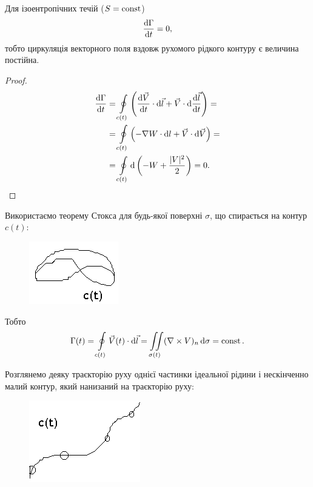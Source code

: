\begin{theorem}
	Для ізоентропічних течій ($S = \operatorname{const}$) 
	\begin{equation}
	 	\frac{\mathop{}\!\mathrm{d} \Gamma}{\mathop{}\!\mathrm{d} t} = 0,
	\end{equation}
	тобто циркуляція векторного поля вздовж рухомого рідкого контуру є величина постійна.
\end{theorem}

\begin{proof}
	\begin{align}
		\frac{\diff \Gamma}{\diff t} &= \Oint_{c(t)} \left( \frac{\diff \vec V}{\diff t} \cdot \diff \vec l + \vec V \cdot \diff \frac{\diff \vec l}{\diff t} \right) = \\
		&= \Oint_{c(t)} \left( - \nabla W \cdot \diff l + \vec V \cdot \diff \vec V \right) = \\
		&= \Oint_{c(t)} \diff \left( - W + \frac{|V|^2}{2} \right) = 0.
	\end{align}
\end{proof}

Використаємо теорему Стокса для будь-якої поверхні $\sigma$, що спирається на контур $c(t)$:
\begin{figure}[H]
	\centering
	\includegraphics[]{img/11-3.png}
\end{figure}

Тобто
\begin{equation}
	\Gamma(t) = \displaystyle\oint\limits_{c(t)} \vec V(t) \cdot \mathop{}\!\mathrm{d} \vec l = \displaystyle\iint\limits_{\sigma(t)} (\nabla \times V)_n \mathop{}\!\mathrm{d} \sigma = \operatorname{const}.
\end{equation}

Розглянемо деяку траєкторію руху однієї частинки ідеальної рідини і нескінченно малий контур, який нанизаний на траєкторію руху:
\begin{figure}[H]
	\centering
	\includegraphics[]{img/11-4.png}
\end{figure}
 
